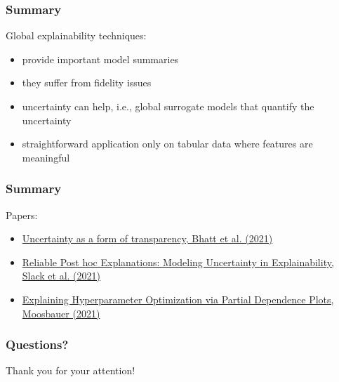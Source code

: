 \begin{frame}
    \frametitle{Summary}
    Global explainability techniques:
    \begin{itemize}
        \item provide important model summaries
        \item they suffer from fidelity issues
        \item uncertainty can help, i.e., global surrogate models that quantify the uncertainty
        \item straightforward application only on tabular data where features are meaningful
    \end{itemize}
\end{frame}


\begin{frame}
    \frametitle{Summary}
    Papers:
    \begin{itemize}
        \item \href{https://dl.acm.org/doi/10.1145/3461702.3462571}{Uncertainty as a form of transparency, Bhatt et al. (2021)}
        \item \href{https://arxiv.org/abs/2008.05030}{Reliable Post hoc Explanations: Modeling Uncertainty in Explainability, Slack et al. (2021)}
        \item \href{https://arxiv.org/abs/2111.04820}{Explaining Hyperparameter Optimization via Partial Dependence Plots, Moosbauer (2021)}
    \end{itemize}
\end{frame}



\begin{frame}
    \frametitle{Questions?}
    Thank you for your attention!
\end{frame}